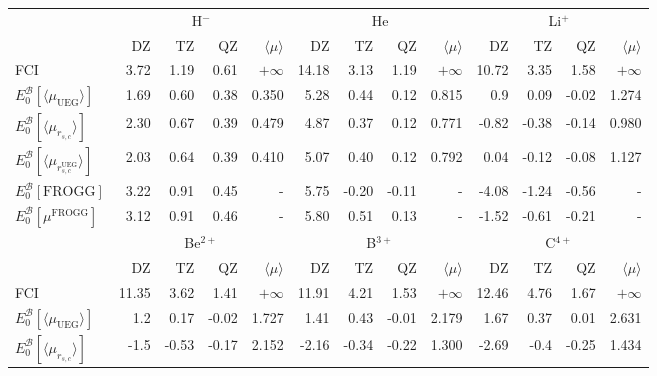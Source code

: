 \documentclass[aip,jcp,reprint,noshowkeys,superscriptaddress]{revtex4-1}
\newcommand{\frogg}[0]{\text{FROGG}}
\newcommand{\mfrogg}[0]{\mu^\text{FROGG}}
\newcommand{\basis}[0]{\mathcal{B}}
\newcommand{\muuegav}{\langle \mu_{\text{UEG}}\rangle}
\newcommand{\muav}{\langle \mu\rangle}
\newcommand{\murscav}{\langle \mu_{r_{s,c}}\rangle}
\newcommand{\mursclda}{\langle \mu_{r_{s,c}^{\text{UEG}}}\rangle}
\begin{document}
\begin{table}
\begin{ruledtabular}
\begin{tabular}{l|rrr|r||rrr|r||rrr|r|}
                         &\multicolumn{4}{c}{H$^-$}                & \multicolumn{4}{c}{He}                  & \multicolumn{4}{c}{Li$^+$}               \\
                         &   DZ    &  TZ      &   QZ    & $\muav$&  DZ     &   TZ     &  QZ  & $\muav$   &   DZ    &   TZ     &  QZ    & $\muav$  \\
\hline 
 FCI                     &   3.72  &    1.19  &   0.61  &$+\infty$ &  14.18  &   3.13   &  1.19&$+\infty$    &  10.72  &   3.35   &  1.58  &$+\infty$  \\      
$E_0^{\basis}[\muuegav]$ &   1.69  &    0.60  &   0.38  & 0.350    &  5.28   &   0.44   &  0.12& 0.815       &  0.9    &   0.09   & -0.02  & 1.274     \\      
$E_0^{\basis}[\murscav]$ &   2.30  &    0.67  &   0.39  & 0.479    &  4.87   &   0.37   &  0.12& 0.771       &  -0.82  &  -0.38   & -0.14  & 0.980     \\      
$E_0^{\basis}[\mursclda]$&   2.03  &    0.64  &   0.39  & 0.410    &  5.07   &   0.40   &  0.12& 0.792       &  0.04   &  -0.12   & -0.08  & 1.127     \\      
$E_0^{\basis}[\frogg]$   &   3.22  &    0.91  &   0.45  &    -     &  5.75   &  -0.20   & -0.11&   -         & -4.08   &  -1.24   & -0.56  &   -       \\
$E_0^{\basis}[\mfrogg]$  &   3.12  &    0.91  &   0.46  &    -     &  5.80   &   0.51   &  0.13&   -         & -1.52   &  -0.61   & -0.21  &   -       \\
\hline              
                         &\multicolumn{4}{c}{Be$^{2+}$}            & \multicolumn{4}{c}{B$^{3+}$}            & \multicolumn{4}{c}{C$^{4+}$}    \\
                         &   DZ    &  TZ      &   QZ    & $\muav$&  DZ     &   TZ     &  QZ     & $\muav$&   DZ    &   TZ     &  QZ    & $\muav$  \\
\hline 
 FCI                     &  11.35  &   3.62   &  1.41   &$+\infty$ &  11.91  &   4.21   &  1.53   &$+\infty$ &  12.46  &   4.76   &  1.67  &$+\infty$    \\  
$E_0^{\basis}[\muuegav]$ &  1.2    &   0.17   & -0.02   &1.727     &  1.41   &   0.43   &  -0.01  &2.179     &  1.67   &   0.37   &  0.01  &2.631        \\  
$E_0^{\basis}[\murscav]$ &  -1.5   &  -0.53   & -0.17   &2.152     &  -2.16  &  -0.34   &  -0.22  &1.300     &  -2.69  &  -0.4    & -0.25  &1.434        \\  

\end{tabular}
\end{ruledtabular}
\end{table}
\end{document}
